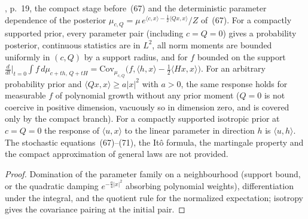 \begin{lemma}
  \label{lem:bkl-posterior-parameter-response}
  \leanok
  \cite{BizeulKlartagLehec2026}, p.~19, the compact stage before~(67) and the deterministic parameter
  dependence of the posterior $\mu_{c,Q}=\mu\,e^{\langle c,x\rangle-\frac12\langle Qx,x\rangle}/Z$ of~(67).
  For a compactly supported prior, every parameter pair (including $c=Q=0$) gives a probability
  posterior, continuous statistics are in $L^2$, all norm moments are bounded uniformly in $(c,Q)$ by a
  support radius, and for $f$ bounded on the support
  $\frac{d}{dt}\big|_{t=0}\int f\,d\mu_{c+th,\,Q+tH}=\mathrm{Cov}_{\mu_{c,Q}}\big(f,\langle h,x\rangle-\tfrac12\langle Hx,x\rangle\big)$.
  For an arbitrary probability prior and $\langle Qx,x\rangle\ge a|x|^2$ with $a>0$, the same response holds
  for measurable $f$ of polynomial growth without any prior moment ($Q=0$ is not coercive in positive dimension, vacuously so in
  dimension zero, and is covered only by the compact branch).  For a compactly supported isotropic prior at $c=Q=0$ the response of
  $\langle u,x\rangle$ to the linear parameter in direction $h$ is $\langle u,h\rangle$.  The stochastic
  equations~(67)--(71), the It\^o formula, the martingale property and the compact approximation of
  general laws are not provided.
\end{lemma}
\begin{proof}
  \leanok
  Domination of the parameter family on a neighbourhood (support bound, or the quadratic damping
  $e^{-\frac a4|x|^2}$ absorbing polynomial weights), differentiation under the integral, and the quotient
  rule for the normalized expectation; isotropy gives the covariance pairing at the initial pair.
\end{proof}

